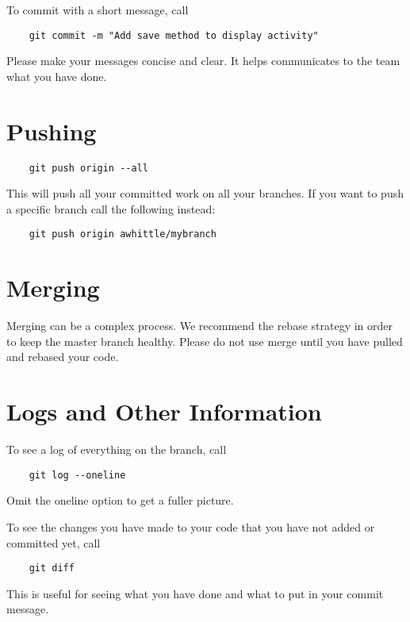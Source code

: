 \documentclass[14pt]{report}
\begin{document}
	To commit with a short message, call 
	\begin{verbatim}
	git commit -m "Add save method to display activity"
	\end{verbatim}
	
	Please make your messages concise and clear.
	It helps communicates to the team what you have done.
		
	\section{Pushing}
	
	\begin{verbatim}
	git push origin --all
	\end{verbatim}
	
	This will push all your committed work on all your branches.  If you want to push a specific branch call the following instead:
	
	\begin{verbatim}
	git push origin awhittle/mybranch
	\end{verbatim}
	
	\section{Merging}
	Merging can be a complex process.
	We recommend the rebase strategy in order to keep the master branch healthy.
	Please do not use merge until you have pulled and rebased your code.
	
	\section{Logs and Other Information}
	
	To see a log of everything on the branch, call
	
	\begin{verbatim}
	git log --oneline
	\end{verbatim}
	
	Omit the oneline option to get a fuller picture.
	
	To see the changes you have made to your code that you have not added or committed yet, call
	
	\begin{verbatim}
	git diff
	\end{verbatim}
	
	This is useful for seeing what you have done and what to put in your commit message.
	
	
\end{document}

